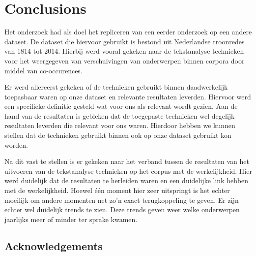 \section{Conclusions}
\label{sec:conc}

Het onderzoek had als doel het repliceren van een eerder onderzoek op een andere dataset. De dataset die hiervoor gebruikt is bestond uit Nederlandse troonredes van 1814 tot 2014. Hierbij werd vooral gekeken naar de tekstanalyse technieken voor het weergegeven van verschuivingen van onderwerpen binnen corpora door middel van co-occurences. 

Er werd allereerst gekeken of de technieken gebruikt binnen \citep{state} daadwerkelijk toepasbaar waren op onze dataset en relevante resultaten leverden. Hiervoor werd een specifieke definitie gesteld wat voor ons als relevant wordt gezien. Aan de hand van de resultaten is gebleken dat de toegepaste technieken wel degelijk resultaten leverden die relevant voor ons waren. Hierdoor hebben we kunnen stellen dat de technieken gebruikt binnen \citep{state} ook op onze dataset gebruikt kon worden.

Na dit vast te stellen is er gekeken naar het verband tussen de resultaten van het uitvoeren van de tekstanalyse technieken op het corpus met de werkelijkheid. Hier werd duidelijk dat de resultaten te herleiden waren en een duidelijke link hebben met de werkelijkheid. Hoewel één moment hier zeer uitspringt is het echter moeilijk om andere momenten net zo'n exact terugkoppeling te geven. Er zijn echter wel duidelijk trends te zien. Deze trends geven weer welke onderwerpen jaarlijks meer of minder ter sprake kwamen.


\subsection{Acknowledgements}
